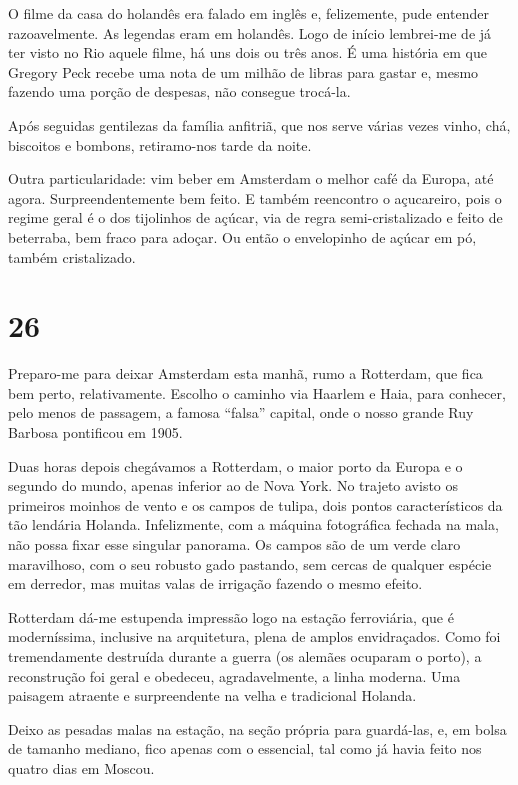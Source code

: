 O filme da casa do holandês era falado em inglês e, felizemente, pude entender razoavelmente. As legendas eram em holandês. Logo de início lembrei-me de já ter visto no Rio aquele filme, há uns dois ou três anos. É uma história em que Gregory Peck recebe uma nota de um milhão de libras para gastar e, mesmo fazendo uma porção de despesas, não consegue trocá-la.

Após seguidas gentilezas da família anfitriã, que nos serve várias vezes vinho, chá, biscoitos e bombons, retiramo-nos tarde da noite.

Outra particularidade: vim beber em Amsterdam o melhor café da Europa, até agora. Surpreendentemente bem feito. E também reencontro o açucareiro, pois o regime geral é o dos tijolinhos de açúcar, via de regra semi-cristalizado e feito de beterraba, bem fraco para adoçar. Ou então o envelopinho de açúcar em pó, também cristalizado.

\section*{26 \adfflatleafright {}}
Preparo-me para deixar Amsterdam esta manhã, rumo a Rotterdam, que fica bem perto, relativamente. Escolho o caminho via Haarlem e Haia, para conhecer, pelo menos de passagem, a famosa ``falsa'' capital, onde o nosso grande Ruy Barbosa pontificou em 1905.

Duas horas depois chegávamos a Rotterdam, o maior porto da Europa e o segundo do mundo, apenas inferior ao de Nova York. No trajeto avisto os primeiros moinhos de vento e os campos de tulipa, dois pontos característicos da tão lendária Holanda. Infelizmente, com a máquina fotográfica fechada na mala, não possa fixar esse singular panorama. Os campos são de um verde claro maravilhoso, com o seu robusto gado pastando, sem cercas de qualquer espécie em derredor, mas muitas valas de irrigação fazendo o mesmo efeito.

Rotterdam dá-me estupenda impressão logo na estação ferroviária, que é moderníssima, inclusive na arquitetura, plena de amplos envidraçados. Como foi tremendamente destruída durante a guerra (os alemães ocuparam o porto), a reconstrução foi geral e obedeceu, agradavelmente, a linha moderna. Uma paisagem atraente e surpreendente na velha e tradicional Holanda.

Deixo as pesadas malas na estação, na seção própria para guardá-las, e, em bolsa de tamanho mediano, fico apenas com o essencial, tal como já havia feito nos quatro dias em Moscou.

